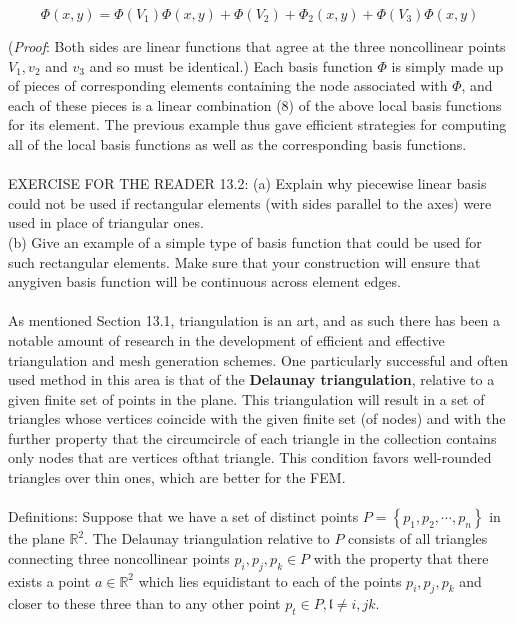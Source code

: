 \documentclass[../main.tex]{subfiles}
\begin{document}
\begin{equation}\label{eqa8}
\Phi(x,y)=\Phi(V_1)\Phi(x,y)+\Phi(V_2)+\Phi_2(x,y)+\Phi(V_3)\Phi(x,y)
\end{equation}

(\textit{Proof}: Both sides are linear functions that agree at the three noncollinear points $V_1,v_2$ and $v_3$ and so must be identical.) Each basis function $\Phi$ is simply made up of pieces of corresponding elements containing the node associated with $\Phi$, and each of these pieces is a linear combination (8) of the above local basis functions for its element. The previous example thus gave efficient strategies for computing all of the local basis functions as well as the corresponding basis functions.
\\
\\
EXERCISE FOR THE READER 13.2: (a) Explain why piecewise linear basis 
 could not be used if rectangular elements (with sides parallel to the axes) were used in place of triangular ones. 
\\
(b) Give an example of a simple type of basis function that could be used for such rectangular elements. Make sure that your construction will ensure that anygiven basis function will be continuous across element edges.
\\
\\
As mentioned Section 13.1, triangulation is an art, and as such there has been a notable amount of research in the development of efficient and effective triangulation and mesh generation schemes. One particularly successful and often used method in this area is that of the \textbf{Delaunay triangulation}, relative to a given finite set of points in the plane. This triangulation will result in a set of triangles whose vertices coincide with the given finite set (of nodes) and with the further property that the circumcircle of each triangle in the collection contains only nodes that are vertices ofthat triangle. This condition favors well-rounded triangles over thin ones, which are better for the FEM.
\\
\\
Definitions: Suppose that we have a set of distinct points $P=\left\{ p_1,p_2, \cdots,p_n \right\}$ in the plane $ \mathbb{R}^2$. The Delaunay triangulation relative to $P$ consists of all triangles connecting three noncollinear points $p_i,p_j,p_k \in P$ with the property that there exists a point $a \in \mathbb{R}^2$ which lies equidistant to each of the points $p_i,p_j,p_k$ and closer to these three than to any other point $p_t \in P,\mathfrak{l} \neq i, j k$. 
\\
\end{document}
